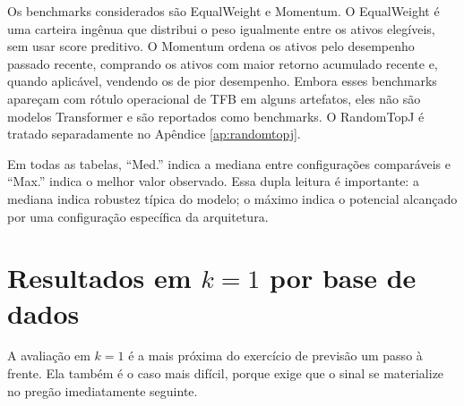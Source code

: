 \documentclass[12pt,a4paper]{article}
\begin{document}
Os benchmarks considerados são EqualWeight e Momentum. O EqualWeight é uma carteira ingênua que distribui o peso igualmente entre os ativos elegíveis, sem usar score preditivo. O Momentum ordena os ativos pelo desempenho passado recente, comprando os ativos com maior retorno acumulado recente e, quando aplicável, vendendo os de pior desempenho. Embora esses benchmarks apareçam com rótulo operacional de TFB em alguns artefatos, eles não são modelos Transformer e são reportados como benchmarks. O RandomTopJ é tratado separadamente no Apêndice \ref{ap:randomtopj}.

Em todas as tabelas, ``Med.'' indica a mediana entre configurações comparáveis e ``Max.'' indica o melhor valor observado. Essa dupla leitura é importante: a mediana indica robustez típica do modelo; o máximo indica o potencial alcançado por uma configuração específica da arquitetura.

\section{Resultados em $k=1$ por base de dados}

A avaliação em $k=1$ é a mais próxima do exercício de previsão um passo à frente. Ela também é o caso mais difícil, porque exige que o sinal se materialize no pregão imediatamente seguinte.

\begin{table}[H]
\centering
\scriptsize
\caption{Base de preços: estatísticas medianas e máximas em $k=1$.}
\label{tab:precos}
\end{table}
\end{document}
